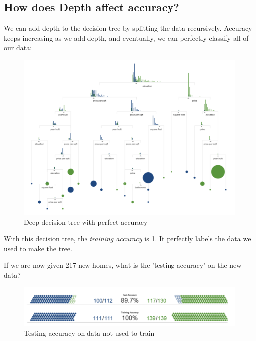 \documentclass{article}
\theoremstyle{definition}
\begin{document}
\subsection*{How does Depth affect accuracy?}
We can add depth to the decision tree by splitting the data recursively. Accuracy keeps increasing as we add depth, and eventually, we can perfectly classify all of our data:
\begin{figure}[H]
	\centering
	\includegraphics[width = 5in]{Pic5}
	\caption{Deep decision tree with perfect accuracy}
\end{figure}
With this decision tree, the \textsl{training accuracy} is 1. It perfectly labels the data we used to make the tree.

If we are now given 217 new homes, what is the 'testing accuracy' on the new data?
\begin{figure}[H]
	\centering
	\includegraphics[width = 6in]{Pic6}
	\caption{Testing accuracy on data not used to train}
\end{figure}
\end{document}
